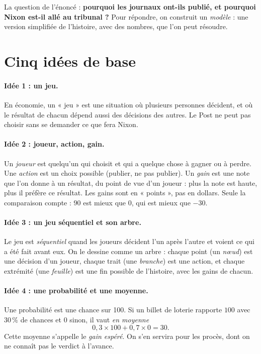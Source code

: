 \documentclass[11pt,a4paper]{article}
\theoremstyle{definition}
\begin{document}
La question de l'énoncé : \textbf{pourquoi les journaux ont-ils publié, et pourquoi Nixon est-il allé au tribunal ?} Pour répondre, on construit un \emph{modèle} : une version simplifiée de l'histoire, avec des nombres, que l'on peut résoudre.

\section{Cinq idées de base}

\paragraph{Idée 1 : un jeu.} En économie, un « jeu » est une situation où plusieurs personnes décident, et où le résultat de chacun dépend aussi des décisions des autres. Le Post ne peut pas choisir sans se demander ce que fera Nixon.

\paragraph{Idée 2 : joueur, action, gain.} Un \emph{joueur} est quelqu'un qui choisit et qui a quelque chose à gagner ou à perdre. Une \emph{action} est un choix possible (publier, ne pas publier). Un \emph{gain} est une note que l'on donne à un résultat, du point de vue d'un joueur : plus la note est haute, plus il préfère ce résultat. Les gains sont en « points », pas en dollars. Seule la comparaison compte : $90$ est mieux que $0$, qui est mieux que $-30$.

\paragraph{Idée 3 : un jeu séquentiel et son arbre.} Le jeu est \emph{séquentiel} quand les joueurs décident l'un après l'autre et voient ce qui a été fait avant eux. On le dessine comme un arbre : chaque point (un \emph{nœud}) est une décision d'un joueur, chaque trait (une \emph{branche}) est une action, et chaque extrémité (une \emph{feuille}) est une fin possible de l'histoire, avec les gains de chacun.

\paragraph{Idée 4 : une probabilité et une moyenne.} Une probabilité est une chance sur 100. Si un billet de loterie rapporte $100$ avec $30\,\%$ de chances et $0$ sinon, il vaut \emph{en moyenne}
\[
0,3\times100+0,7\times0=30 .
\]
Cette moyenne s'appelle le \emph{gain espéré}. On s'en servira pour les procès, dont on ne connaît pas le verdict à l'avance.
\end{document}
